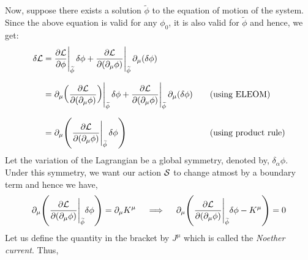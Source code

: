 Now, suppose there exists a solution $\widetilde{\phi}$ to the equation of motion of the system. Since the above equation is valid for any $\phi_0$, it is also valid for $\widetilde{\phi}$ and hence, we get:
\begin{alignat*}{2}
    \delta \mathcal L &= \pdv{\mathcal L}{\phi}\Bigg|_{\widetilde{\phi}} \, \delta \phi
    + \pdv{\mathcal L}{(\partial_\mu \phi)}\Bigg|_{\widetilde{\phi}} \, \partial_\mu (\delta \phi) 
    & \quad & \\[6pt]
    &= \partial_\mu \qty( \pdv{\mathcal L}{(\partial_\mu \phi)} )\Bigg|_{\widetilde{\phi}} \, \delta \phi
    + \pdv{\mathcal L}{(\partial_\mu \phi)}\Bigg|_{\widetilde{\phi}} \, \partial_\mu (\delta \phi) 
    & \quad & \text{(using ELEOM)} \\[6pt]
    &= \partial_\mu \qty( \pdv{\mathcal L}{(\partial_\mu \phi)}\Bigg|_{\widetilde{\phi}} \, \delta \phi )
    & \quad & \text{(using product rule)}
\end{alignat*}
Let the variation of the Lagrangian be a global symmetry, denoted by, $\delta_\alpha \phi$. Under this symmetry, we want our action $\mathcal S$ to change atmost by a boundary term and hence we have,
$$\partial_\mu\qty(\pdv{\mathcal L}{(\partial_\mu{\phi})}\Bigg|_{\widetilde{\phi}}\delta{\phi}) = \partial_\mu K^\mu\quad\implies\quad \partial_\mu\qty(\pdv{\mathcal L}{(\partial_\mu{\phi})}\Bigg|_{\widetilde{\phi}}\delta{\phi} - K^\mu)=0$$
Let us define the quantity in the bracket by $J^\mu$ which is called the \textit{Noether current}. Thus, 

